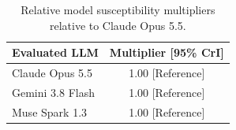 \begin{table}[!ht]\centering\footnotesize
\caption{Relative model susceptibility multipliers relative to Claude Opus 5.5.}\label{tab:model-variability}
\begin{tabularx}{\columnwidth}{@{}X c@{}}\toprule
Evaluated LLM & Multiplier [95\% CrI] \\
\midrule
Claude Opus 5.5 & 1.00 [Reference] \\
Gemini 3.8 Flash & 1.00 [Reference] \\
Muse Spark 1.3 & 1.00 [Reference] \\
\bottomrule\end{tabularx}
\end{table}
